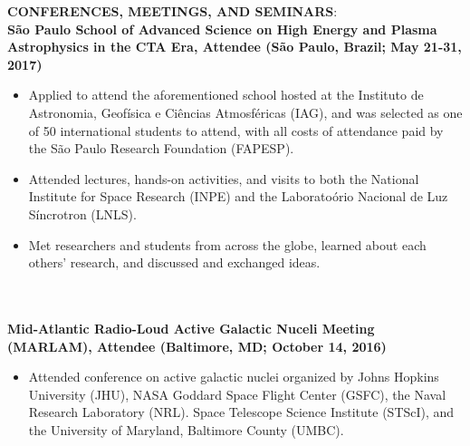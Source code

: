 \documentclass{article}
\begin{document}
\noindent \textbf{CONFERENCES, MEETINGS, AND SEMINARS}:\\
\noindent \textbf{S\~{a}o Paulo School of Advanced Science on High Energy and Plasma Astrophysics in the CTA Era, Attendee (S\~{a}o Paulo, Brazil; May 21-31, 2017)}
\phantom \\
\begin{itemize}
\item Applied to attend the aforementioned school hosted at the Instituto de Astronomia, Geof\'{i}sica e Ci\^{e}ncias Atmosf\'{e}ricas (IAG), and was selected as one of 50 international students to attend, with all costs of attendance paid by the S\~{a}o Paulo Research Foundation (FAPESP).
\item Attended lectures, hands-on activities, and visits to both the National Institute for Space Research (INPE) and the Laborato\'{o}rio Nacional de Luz S\'{i}ncrotron (LNLS).
\item Met researchers and students from across the globe, learned about each others' research, and discussed and exchanged ideas.
\end{itemize}
\phantom \\
\phantom \\
%
%
%
%
\noindent \textbf{Mid-Atlantic Radio-Loud Active Galactic Nuceli Meeting (MARLAM), Attendee (Baltimore, MD; October 14, 2016)}
\phantom \\
\begin{itemize}
\item Attended conference on active galactic nuclei organized by Johns Hopkins University (JHU),  NASA Goddard Space Flight Center (GSFC), the Naval Research Laboratory (NRL). Space Telescope Science Institute (STScI), and the University of Maryland, Baltimore County (UMBC).
\end{itemize}
\phantom \\
\phantom \\
%
%
%
%
%
%
\end{document}
